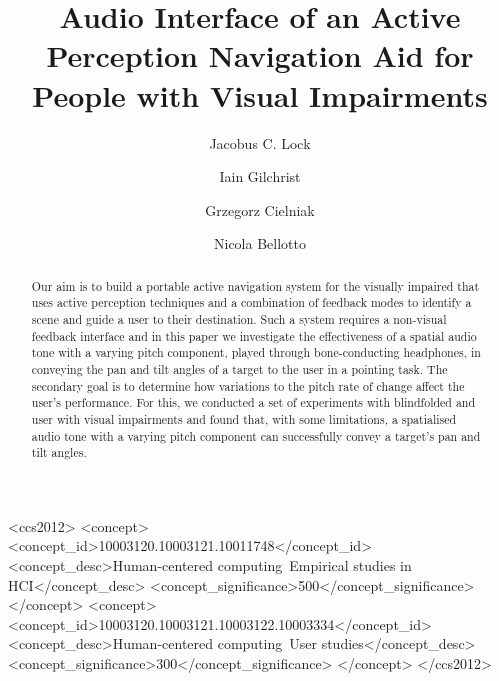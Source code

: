 \documentclass[sigconf, screen=true, anonymous=true]{acmart}
\begin{document}
\title[Active Perception Interface for People with Visual Impairments]{Audio Interface of an Active Perception Navigation Aid for People with Visual Impairments}

\author{Jacobus C. Lock}

\author{Iain Gilchrist}

\author{Grzegorz Cielniak}

\author{Nicola Bellotto}

\begin{CCSXML}
  <ccs2012>
    <concept>
      <concept_id>10003120.10003121.10011748</concept_id>
      <concept_desc>Human-centered computing~Empirical studies in HCI</concept_desc>
      <concept_significance>500</concept_significance>
    </concept>
    <concept>
      <concept_id>10003120.10003121.10003122.10003334</concept_id>
      <concept_desc>Human-centered computing~User studies</concept_desc>
      <concept_significance>300</concept_significance>
    </concept>
  </ccs2012>
\end{CCSXML}



\maketitle
\renewcommand{\shortauthors}{JC Lock et al.}

\begin{abstract}
	Our aim is to build a portable active navigation system for the visually impaired that uses active perception techniques and a combination of feedback modes to identify a scene and guide a user to their destination.
	Such a system requires a non-visual feedback interface and in this paper we investigate the effectiveness of a spatial audio tone with a varying pitch component, played through bone-conducting headphones, in conveying the pan and tilt angles of a target to the user in a pointing task.
	The secondary goal is to determine how variations to the pitch rate of change affect the user's performance.
	For this, we conducted a set of experiments with blindfolded and user with visual impairments and found that, with some limitations, a spatialised audio tone with a varying pitch component can successfully convey a target's pan and tilt angles. 
\end{abstract} 
\end{document}
